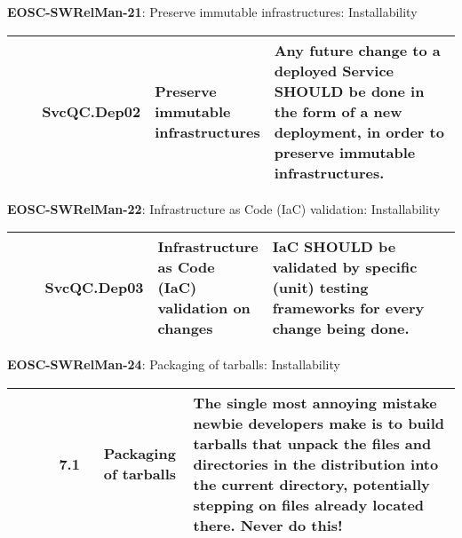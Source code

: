 \textbf{EOSC-SWRelMan-21}: Preserve immutable infrastructures: Installability
\nopagebreak[4]
\begin{center}
    \tabletail{\hline}
    \tiny
    \begin{supertabular}{|p{0.10\linewidth}|p{0.10\linewidth}|p{0.20\linewidth}|p{0.60\linewidth}|} \hline
        \cite{orviz_fernandez_eosc-synergy_2020} & SvcQC.Dep02 & Preserve immutable infrastructures & Any future change to a deployed Service SHOULD be done in the form of a new deployment, in order to preserve immutable infrastructures.\\ \hline
    \end{supertabular}
\end{center}

\textbf{EOSC-SWRelMan-22}: Infrastructure as Code (IaC) validation: Installability
\nopagebreak[4]
\begin{center}
    \tabletail{\hline}
    \tiny
    \begin{supertabular}{|p{0.10\linewidth}|p{0.10\linewidth}|p{0.20\linewidth}|p{0.60\linewidth}|} \hline
        \cite{orviz_fernandez_eosc-synergy_2020} & SvcQC.Dep03 & Infrastructure as Code (IaC) validation on changes & IaC SHOULD be validated by specific (unit) testing frameworks for every change being done.\\ \hline
    \end{supertabular}
\end{center}

\textbf{EOSC-SWRelMan-24}: Packaging of tarballs: Installability
\nopagebreak[4]
\begin{center}
    \tabletail{\hline}
    \tiny
    \begin{supertabular}{|p{0.10\linewidth}|p{0.10\linewidth}|p{0.20\linewidth}|p{0.60\linewidth}|} \hline
        \cite{raymond_software_2013} & 7.1 & Packaging of tarballs & The single most annoying mistake newbie developers make is to build tarballs that unpack the files and directories in the distribution into the current directory, potentially stepping on files already located there. Never do this!\\ \hline
    \end{supertabular}
\end{center}

